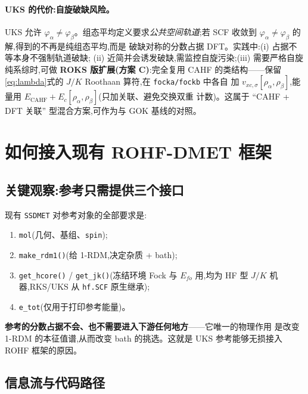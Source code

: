 \documentclass[11pt,a4paper]{ctexart}
\begin{document}
\paragraph{UKS 的代价:自旋破缺风险。}UKS 允许 $\varphi_\alpha \neq
\varphi_\beta$。组态平均定义要求\emph{公共空间轨道};若 SCF 收敛到
$\varphi_\alpha \neq \varphi_\beta$ 的解,得到的不再是纯组态平均,而是
破缺对称的分数占据 DFT。实践中:(i) 占据不等本身不强制轨道破缺;
(ii) 近简并会诱发破缺,需监控自旋污染;(iii) 需要严格自旋纯系综时,可做
\textbf{ROKS 版扩展(方案 C)}:完全复用 CAHF 的类结构——保留
\eqref{eq:lambda}式的 $J/K$ Roothaan 算符,在 \texttt{focka/fockb} 中各自
加 $v_{xc,\sigma}[\rho_\alpha,\rho_\beta]$,能量用
$E_{\mathrm{CAHF}} + E_c[\rho_\alpha,\rho_\beta]$(只加关联、避免交换双重
计数)。这属于 ``CAHF + DFT 关联'' 型混合方案,可作为与 GOK 基线的对照。

\section{如何接入现有 ROHF-DMET 框架}\label{sec:rohf}

\subsection{关键观察:参考只需提供三个接口}

现有 \texttt{SSDMET} 对参考对象的全部要求是:
\begin{enumerate}
  \item \texttt{mol}(几何、基组、\texttt{spin});
  \item \texttt{make\_rdm1()}(给 1-RDM,决定杂质 + bath);
  \item \texttt{get\_hcore()} / \texttt{get\_jk()}(冻结环境 Fock 与
        $E_{fo}$ 用,均为 HF 型 $J/K$ 机器,RKS/UKS 从 \texttt{hf.SCF}
        原生继承);
  \item \texttt{e\_tot}(仅用于打印参考能量)。
\end{enumerate}
\textbf{参考的分数占据不会、也不需要进入下游任何地方}——它唯一的物理作用
是改变 1-RDM 的本征值谱,从而改变 bath 的挑选。这就是 UKS 参考能够无损接入
ROHF 框架的原因。

\subsection{信息流与代码路径}
\end{document}

